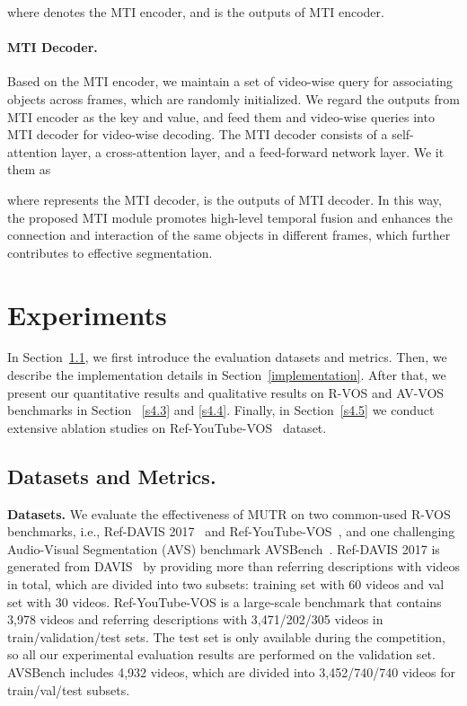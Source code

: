 \documentclass{article}
\begin{document}
where  denotes the MTI encoder, and  is the outputs of MTI encoder.

\paragraph{MTI Decoder.}
Based on the MTI encoder, we maintain a set of video-wise query  for associating objects across frames, which are randomly initialized. We regard the outputs from MTI encoder as the key and value, and feed them and video-wise queries  into MTI decoder for video-wise decoding. The MTI decoder consists of a self-attention layer, a cross-attention layer, and a feed-forward network layer. We it them as

where  represents the MTI decoder,  is the outputs of MTI decoder. 
In this way, the proposed MTI module promotes high-level temporal fusion and enhances the connection and interaction of the same objects in different frames, which further contributes to effective segmentation.



\section{Experiments}

In Section~\ref{s4.1}, we first introduce the evaluation datasets and metrics. Then, we describe the implementation details in Section~\ref{implementation}.
After that, we present our quantitative results and qualitative results on R-VOS and AV-VOS benchmarks in Section ~\ref{s4.3} and \ref{s4.4}. Finally, in Section~\ref{s4.5} we conduct extensive ablation studies on Ref-YouTube-VOS~\cite{seo2020urvos} dataset.

\subsection{Datasets and Metrics.}\label{s4.1}

\textbf{Datasets.} We evaluate the effectiveness of MUTR on two common-used R-VOS benchmarks, i.e., Ref-DAVIS 2017~\cite{khoreva2019video} and Ref-YouTube-VOS~\cite{seo2020urvos}, and one challenging Audio-Visual Segmentation (AVS) benchmark AVSBench~\cite{zhou2022audio}. Ref-DAVIS 2017 is generated from DAVIS~\cite{pont20172017} by providing more than  referring descriptions with  videos in total, which are divided into two subsets: training set with 60 videos and val set with 30 videos. Ref-YouTube-VOS is a large-scale benchmark that contains 3,978 videos and  referring descriptions with 3,471/202/305 videos in train/validation/test sets. 
The test set is only available during the competition, so all our experimental evaluation results are performed on the validation set.
AVSBench includes 4,932 videos, which are divided into 3,452/740/740 videos for train/val/test subsets. 
\end{document}
